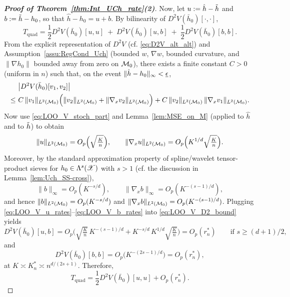 \documentclass[12pt,american]{article}
\theoremstyle{definition}
\theoremstyle{plain}
\theoremstyle{definition}
\theoremstyle{plain}
\theoremstyle{plain}
\theoremstyle{plain}
\theoremstyle{plain}
\theoremstyle{plain}
\begin{document}
\begin{proof}[\textbf{Proof of Theorem~\ref{thm:Int_UCh_rate}(2)}]
\smallskip
Now, let $u:=\hat h-\tilde{h}$ and $b:=\tilde{h}-h_0$, so that $\hat h-h_0=u+b$.
By bilinearity of $D^2V(\bar h_0)[\cdot,\cdot]$,
\begin{equation}\label{eq:LOO_V_u_plus_b}
T_{\mathrm{quad}}=\frac12 D^2V(\bar h_0)[u,u]\; +\; D^2V(\bar h_0)[u,b]\; +\; \frac12 D^2V(\bar h_0)[b,b].
\end{equation}
From the explicit representation of $D^2V$ (cf. \eqref{eq:D2V_alt_alt}) and Assumption~\ref{assu:RegCond_Uch} (bounded $w$, $\nabla w$, bounded curvature, and $\|\nabla h_0\|$ bounded away from zero on $\mathcal{M}_0$), there exists a finite constant $C>0$ (uniform in $n$) such that, on the event $\|\hat h-h_0\|_{\infty}<\underline{\epsilon}$,
\begin{align}\label{eq:LOO_V_D2_bound}
&\big|D^2V(\bar h_0)[v_1,v_2]\big|\\\nonumber
\le \ & C\,\|v_1\|_{L^2(\mathcal{M}_0)}\Big(\|v_2\|_{L^2(\mathcal{M}_0)}+\|\nabla_x v_2\|_{L^2(\mathcal{M}_0)}\Big)
+C\,\|v_2\|_{L^2(\mathcal{M}_0)}\,\|\nabla_x v_1\|_{L^2(\mathcal{M}_0)}.
\end{align}
Now use \eqref{eq:LOO_V_stoch_part} and Lemma~\ref{lem:MSE_on_M} (applied to $\hat h$ and to $\tilde{h}$) to obtain
\begin{equation}\label{eq:LOO_V_u_rates}
\|u\|_{L^2(\mathcal{M}_0)}=O_p\Big(\sqrt{\tfrac{K}{n}}\Big),\qquad
\|\nabla_x u\|_{L^2(\mathcal{M}_0)}=O_p\Big(K^{1/d}\sqrt{\tfrac{K}{n}}\Big).
\end{equation}
Moreover, by the standard approximation property of spline/wavelet tensor-product sieves for $h_0\in\Lambda^s(\mathscr{X})$ with $s>1$ (cf. the discussion in Lemma~\ref{lem:Uch_SS-cross}),
\begin{equation}\label{eq:LOO_V_b_rates}
\|b\|_{\infty}=O_p(K^{-s/d}),\qquad
\|\nabla_x b\|_{\infty}=O_p(K^{-(s-1)/d}),
\end{equation}
and hence $\|b\|_{L^2(\mathcal{M}_0)}=O_p(K^{-s/d})$ and $\|\nabla_x b\|_{L^2(\mathcal{M}_0)}=O_p(K^{-(s-1)/d})$.
Plugging \eqref{eq:LOO_V_u_rates}--\eqref{eq:LOO_V_b_rates} into \eqref{eq:LOO_V_D2_bound} yields
\begin{equation}\label{eq:LOO_V_cross_bias_orders}
D^2V(\bar h_0)[u,b]=O_p\Big(\sqrt{\tfrac{K}{n}}\,K^{-(s-1)/d} + K^{-s/d}\,K^{1/d}\sqrt{\tfrac{K}{n}}\Big)=O_p(r_n^*)\qquad\text{if }s\ge (d+1)/2,
\end{equation}
and
\begin{equation}\label{eq:LOO_V_bb_order}
D^2V(\bar h_0)[b,b]=O_p\big(K^{-(2s-1)/d}\big)=O_p(r_n^*),
\end{equation}
at $K\asymp K_n^*\asymp n^{d/(2s+1)}$.
Therefore,
\begin{equation}\label{eq:LOO_V_Tquad_reduced}
T_{\mathrm{quad}}=\frac12 D^2V(\bar h_0)[u,u]+O_p(r_n^*).
\end{equation}


\end{proof}
\end{document}

